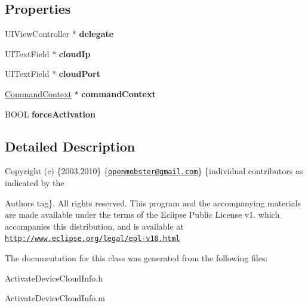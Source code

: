 \subsection*{\-Properties}
\begin{DoxyCompactItemize}
\item 
\hypertarget{interface_activate_device_cloud_info_a356873d34a829b2cffcf5478c318c4aa}{
\-U\-I\-View\-Controller $\ast$ {\bfseries delegate}}
\label{interface_activate_device_cloud_info_a356873d34a829b2cffcf5478c318c4aa}

\item 
\hypertarget{interface_activate_device_cloud_info_a7bc7c83d7fc4eda7613759c2b2c39277}{
\-U\-I\-Text\-Field $\ast$ {\bfseries cloud\-Ip}}
\label{interface_activate_device_cloud_info_a7bc7c83d7fc4eda7613759c2b2c39277}

\item 
\hypertarget{interface_activate_device_cloud_info_ae76ab10b1fe9414ba7eca3cbddcf7e13}{
\-U\-I\-Text\-Field $\ast$ {\bfseries cloud\-Port}}
\label{interface_activate_device_cloud_info_ae76ab10b1fe9414ba7eca3cbddcf7e13}

\item 
\hypertarget{interface_activate_device_cloud_info_a3518bd82ee2bf49007b147ad38fbac96}{
\hyperlink{interface_command_context}{\-Command\-Context} $\ast$ {\bfseries command\-Context}}
\label{interface_activate_device_cloud_info_a3518bd82ee2bf49007b147ad38fbac96}

\item 
\hypertarget{interface_activate_device_cloud_info_a1684a039a9a51efe1cb915f9557b1f73}{
\-B\-O\-O\-L {\bfseries force\-Activation}}
\label{interface_activate_device_cloud_info_a1684a039a9a51efe1cb915f9557b1f73}

\end{DoxyCompactItemize}


\subsection{\-Detailed \-Description}
\-Copyright (c) \{2003,2010\} \{\href{mailto:openmobster@gmail.com}{\tt openmobster@gmail.\-com}\} \{individual contributors as indicated by the \begin{DoxyAuthor}{\-Authors}
tag\}. \-All rights reserved. \-This program and the accompanying materials are made available under the terms of the \-Eclipse \-Public \-License v1. which accompanies this distribution, and is available at \href{http://www.eclipse.org/legal/epl-v10.html}{\tt http\-://www.\-eclipse.\-org/legal/epl-\/v10.\-html} 
\end{DoxyAuthor}


\-The documentation for this class was generated from the following files\-:\begin{DoxyCompactItemize}
\item 
\-Activate\-Device\-Cloud\-Info.\-h\item 
\-Activate\-Device\-Cloud\-Info.\-m\end{DoxyCompactItemize}
